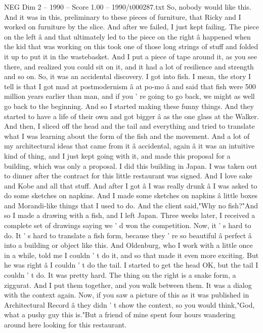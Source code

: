 \begin{textsample}{NEG Dim 2 – 1990 – Score 1.00 – 1990/t000287.txt}
So, nobody would like this.
And it was in this, preliminary to these pieces of furniture, that Ricky and I worked on furniture by the slice.
And after we failed, I just kept failing.
The piece on the left â and that ultimately led to the piece on the right â happened when the kid that was working on this took one of those long strings of stuff and folded it up to put it in the wastebasket.
And I put a piece of tape around it, as you see there, and realized you could sit on it, and it had a lot of resilience and strength and so on.
So, it was an accidental discovery.
I got into fish.
I mean, the story I tell is that I got mad at postmodernism â at po-mo â and said that fish were 500 million years earlier than man, and if you ' re going to go back, we might as well go back to the beginning.
And so I started making these funny things.
And they started to have a life of their own and got bigger â as the one glass at the Walker.
And then, I sliced off the head and the tail and everything and tried to translate what I was learning about the form of the fish and the movement.
And a lot of my architectural ideas that came from it â accidental, again â it was an intuitive kind of thing, and I just kept going with it, and made this proposal for a building, which was only a proposal.
I did this building in Japan.
I was taken out to dinner after the contract for this little restaurant was signed.
And I love sake and Kobe and all that stuff.
And after I got â I was really drunk â I was asked to do some sketches on napkins.
And I made some sketches on napkins â little boxes and Morandi-like things that I used to do.
And the client said,"Why no fish?"And so I made a drawing with a fish, and I left Japan.
Three weeks later, I received a complete set of drawings saying we ' d won the competition.
Now, it ' s hard to do.
It ' s hard to translate a fish form, because they ' re so beautiful â perfect â into a building or object like this.
And Oldenburg, who I work with a little once in a while, told me I couldn ' t do it, and so that made it even more exciting.
But he was right â I couldn ' t do the tail.
I started to get the head OK, but the tail I couldn ' t do.
It was pretty hard.
The thing on the right is a snake form, a ziggurat.
And I put them together, and you walk between them.
It was a dialog with the context again.
Now, if you saw a picture of this as it was published in Architectural Record â they didn ' t show the context, so you would think,"God, what a pushy guy this is."But a friend of mine spent four hours wandering around here looking for this restaurant.

\end{textsample}
